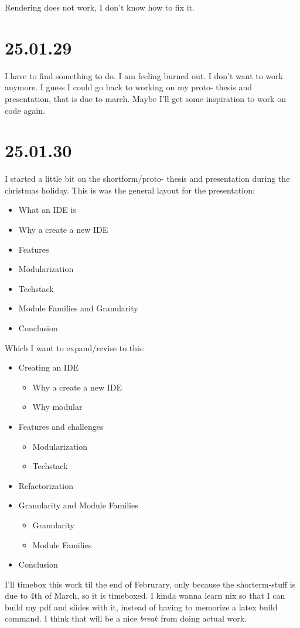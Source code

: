 Rendering does not work, I don't know how to fix it.


\section{25.01.29}

I have to find something to do. I am feeling burned out. I don't want to work
anymore. I guess I could go back to working on my proto- thesis and presentation,
that is due to march. Maybe I'll get some inspiration to work on code again.


\section{25.01.30}

I started a little bit on the shortform/proto- thesis and presentation during
the christmas holiday. This is was the general layout for the presentation:

\begin{itemize}
  \item What an IDE is
  \item Why a create a new IDE
  \item Features
  \item Modularization
  \item Techstack
  \item Module Families and Granularity
  \item Conclusion
\end{itemize}

Which I want to expand/revise to this:

\begin{itemize}
  \item Creating an IDE
  \begin{itemize}
    \item Why a create a new IDE
    \item Why modular
  \end{itemize}
  \item Features and challenges
  \begin{itemize}
    \item Modularization
    \item Techstack
  \end{itemize}
  \item Refactorization
  \item Granularity and Module Families
  \begin{itemize}
    \item Granularity
    \item Module Families
  \end{itemize}
  \item Conclusion
\end{itemize}

I'll timebox this work til the end of Februrary, only because the shorterm-stuff
is due to 4th of March, so it is timeboxed. I kinda wanna learn nix so that I
can build my pdf and slides with it, instead of having to memorize a latex build
command. I think that will be a nice \textit{break} from doing actual work.
